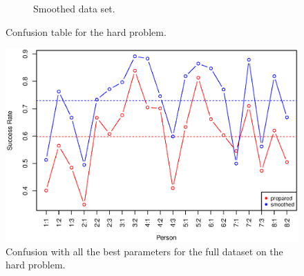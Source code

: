 \begin{figure}[H]
\begin{subfigure}{0.49\textwidth}
\caption{Smoothed data set.}
\end{subfigure}
\caption[Confusion table for decision tree on the hard problem.]{Confusion table for the hard problem.}
\label{fig:tree_confus_all}
\end{figure}

\begin{figure}[H]
\centering
\includegraphics[width=\textwidth]{graphics/tree_performance_all_combined}
\caption[Success for decision tree on the hard problem.]{Confusion with all the best parameters for the full dataset on the hard problem.}
\label{fig:tree_performance_all}
\end{figure}